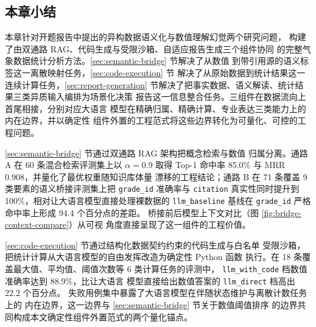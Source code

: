 \documentclass[a4paper]{article}
\theoremstyle{definition}
\theoremstyle{plain}
\theoremstyle{remark}
\newcommand{\reffig}[1]{图 \ref{#1}}
\newcommand{\bk}{\discretionary{}{}{}}
\begin{document}

\subsection{本章小结}
\label{sec:chap4-summary}

本章针对开题报告中提出的异构数据语义化与数值理解幻觉两个研究问题，
构建了由双通路 RAG、代码生成与受限沙箱、自适应报告生成三个组件协同
的完整气象数据统计分析方法。\ref{sec:semantic-bridge} 节解决了从数值
到带引用源的语义标签这一离散映射任务，\ref{sec:code-execution} 节
解决了从原始数据到统计结果这一连续计算任务，\ref{sec:report-generation}
节解决了把事实数据、语义解读、统计结果三类异质输入编排为场景化决策
报告这一信息整合任务。三组件在数据流向上首尾相接，分别对应大语言
模型在精确归属、精确计算、专业表达三类能力上的内在边界，并以确定性
组件外置的工程范式将这些边界转化为可量化、可控的工程问题。

\ref{sec:semantic-bridge} 节通过双通路 RAG 架构把概念检索与数值
归属分离。通路 A 在 60 条混合检索评测集上以 $\alpha = 0.9$ 取得
Top-1 命中率 85.0\% 与 MRR 0.908，并量化了最优权重随知识库体量
漂移的工程结论；通路 B 在 71 条覆盖 9 类要素的语义桥接评测集上把
\texttt{grade\_\bk{}id} 准确率与 \texttt{citation} 真实性同时提升到
100\%，相对让大语言模型直接处理裸数据的 \texttt{llm\_\bk{}baseline}
基线在 \texttt{grade\_\bk{}id} 严格命中率上形成 94.4 个百分点的差距。
桥接前后模型上下文对比（\reffig{fig:bridge-context-compare}）从可视
角度直接呈现了这一组件的工程价值。

\ref{sec:code-execution} 节通过结构化数据契约约束的代码生成与白名单
受限沙箱，把统计计算从大语言模型的自由发挥改造为确定性 Python 函数
执行。在 18 条覆盖最大值、平均值、阈值次数等 6 类计算任务的评测中，
\texttt{llm\_\bk{}with\_\bk{}code} 档数值准确率达到 88.9\%，比让大语言
模型直接给出数值答案的 \texttt{llm\_\bk{}direct} 档高出 22.2 个百分点。
失败用例集中暴露了大语言模型在伴随状态维护与离散计数任务上的
内在边界，这一边界与 \ref{sec:semantic-bridge} 节关于数值阈值排序
的边界共同构成本文确定性组件外置范式的两个量化锚点。
\end{document}
